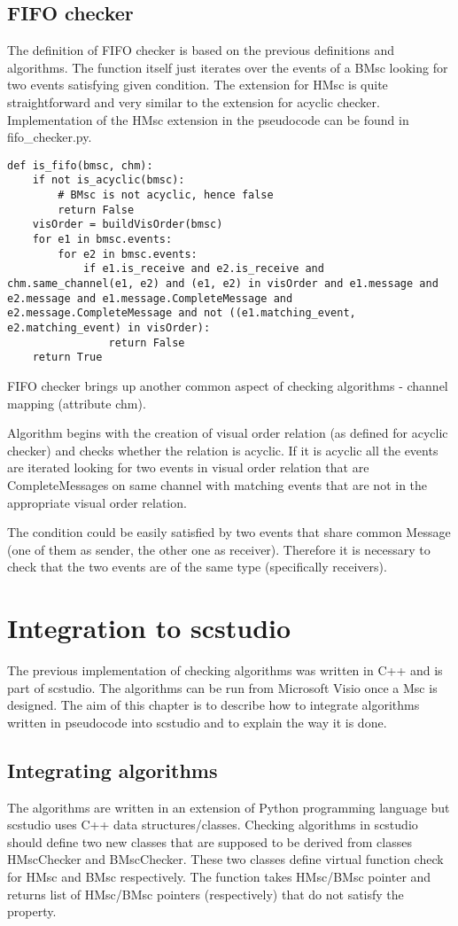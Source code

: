 \documentclass[11pt,oneside]{fithesis2}
\begin{document}
\section{FIFO checker}

The definition of FIFO checker is based on the previous definitions and algorithms. The function itself just iterates over the events of a BMsc looking for two events satisfying given condition. The extension for HMsc is quite straightforward and very similar to the extension for acyclic checker. Implementation of the HMsc extension in the pseudocode can be found in fifo\_checker.py.
\begin{lstlisting}
def is_fifo(bmsc, chm):
    if not is_acyclic(bmsc):
        # BMsc is not acyclic, hence false
        return False
    visOrder = buildVisOrder(bmsc)
    for e1 in bmsc.events:
        for e2 in bmsc.events:
            if e1.is_receive and e2.is_receive and chm.same_channel(e1, e2) and (e1, e2) in visOrder and e1.message and e2.message and e1.message.CompleteMessage and e2.message.CompleteMessage and not ((e1.matching_event, e2.matching_event) in visOrder):
                return False
    return True
\end{lstlisting}

FIFO checker brings up another common aspect of checking algorithms - channel mapping (attribute chm).

Algorithm begins with the creation of visual order relation (as defined for acyclic checker) and checks whether the relation is acyclic. If it is acyclic all the events are iterated looking for two events in visual order relation that are CompleteMessages on same channel with matching events that are not in the appropriate visual order relation.

The condition could be easily satisfied by two events that share common Message (one of them as sender, the other one as receiver). Therefore it is necessary to check that the two events are of the same type (specifically receivers).

\chapter{Integration to scstudio}
The previous implementation of checking algorithms was written in C++ and is part of scstudio. The algorithms can be run from Microsoft Visio once a Msc is designed.
The aim of this chapter is to describe how to integrate algorithms written in pseudocode into scstudio and to explain the way it is done.
\section{Integrating algorithms}
The algorithms are written in an extension of Python programming language but scstudio uses C++ data structures/classes. Checking algorithms in scstudio should define two new classes that are supposed to be derived from classes HMscChecker and BMscChecker. These two classes define virtual function check for HMsc and BMsc respectively. The function takes HMsc/BMsc pointer and returns list of HMsc/BMsc pointers (respectively) that do not satisfy the property.
\end{document}
